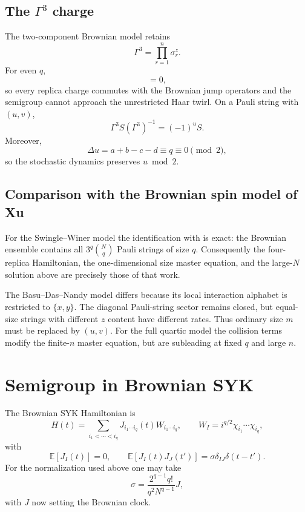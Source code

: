 \documentclass{article}
\theoremstyle{definition}
\begin{document}
\subsection{The $\Gamma^3$ charge}

The two-component Brownian model retains
\begin{equation}
    \Gamma^3=\prod_{r=1}^n\sigma_r^z.
\end{equation}
For even $q$,
\begin{equation}
    [\Gamma^3,V_I]=0,
\end{equation}
so every replica charge commutes with the Brownian jump operators and the
semigroup cannot approach the unrestricted Haar twirl.  On a Pauli string
with $(u,v)$,
\begin{equation}
    \Gamma^3S(\Gamma^3)^{-1}=(-1)^uS.
\end{equation}
Moreover,
\begin{equation}
    \Delta u=a+b-c-d\equiv q\equiv0\pmod2,
\end{equation}
so the stochastic dynamics preserves $u\bmod2$.

\subsection{Comparison with the Brownian spin model of Xu}

For the Swingle--Winer model the identification with
\cite{XuBrownianSpin} is exact: the Brownian ensemble contains all
$3^q\binom Nq$ Pauli strings of size $q$.  Consequently the four-replica
Hamiltonian, the one-dimensional size master equation, and the large-$N$
solution above are precisely those of that work.

The Basu--Das--Nandy model differs because its local interaction alphabet is
restricted to $\{x,y\}$.  The diagonal Pauli-string sector remains closed,
but equal-size strings with different $z$ content have different rates.
Thus ordinary size $m$ must be replaced by $(u,v)$.  For the full quartic
model the collision terms modify the finite-$n$ master equation, but are
subleading at fixed $q$ and large $n$.


\section{Semigroup in Brownian SYK}

The Brownian SYK Hamiltonian is
\begin{equation}
    H(t)
    =\sum_{i_1<\cdots<i_q}
    J_{i_1\cdots i_q}(t)W_{i_1\cdots i_q},
    \qquad
    W_I=i^{q/2}\chi_{i_1}\cdots\chi_{i_q},
\end{equation}
with
\begin{equation}
    \mathbb E[J_I(t)]=0,
    \qquad
    \mathbb E[J_I(t)J_J(t')]
    =\sigma\delta_{IJ}\delta(t-t').
\end{equation}
For the normalization used above one may take
\begin{equation}
    \sigma=\frac{2^{q-1}q!}{q^2N^{q-1}}J,
\end{equation}
with $J$ now setting the Brownian clock.
\end{document}
